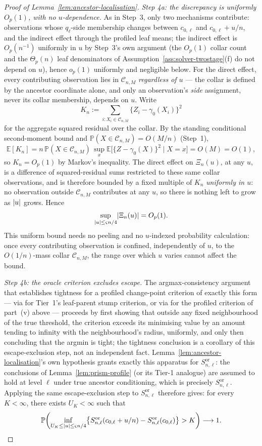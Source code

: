 \documentclass[11pt]{article}
\theoremstyle{plain}
\theoremstyle{definition}
\theoremstyle{remark}
\newcommand{\E}{\mathbb{E}}
\newcommand{\PP}{\mathbb{P}}
\DeclarePairedDelimiter{\abs}{\lvert}{\rvert}
\begin{document}
\begin{proof}[Proof of Lemma~\ref{lem:ancestor-localisation}]
\emph{Step 4a: the discrepancy is uniformly $O_p(1)$, with no $u$-dependence.}
As in Step~3, only two mechanisms contribute: observations whose
$q_\ell$-side membership changes between $c_{0,\ell}$ and $c_{0,\ell}+u/n$,
and the indirect effect through the profiled leaf means; the indirect
effect is $O_p(n^{-1})$ uniformly in $u$ by Step~3's own argument (the
$O_p(1)$ collar count and the $\Theta_p(n)$ leaf denominators of
Assumption~\ref{ass:solver-twostage}(f) do not depend on $u$), hence
$o_p(1)$ uniformly and negligible below. For the direct effect, every
contributing observation lies in $\mathcal C_{n,M}$ \emph{regardless of
$u$} --- the collar is defined by the ancestor coordinate alone, and only
an observation's \emph{side} assignment, never its collar membership,
depends on $u$. Write
\[
  K_n
  :=
  \sum_{i:X_i\in\mathcal C_{n,M}}
  \{Z_i-\gamma_0(X_i)\}^2
\]
for the aggregate squared residual over the collar. By the standing
conditional second-moment bound and $\PP(X\in\mathcal C_{n,M})=O(M/n)$
(Step~1),
\[
  \E[K_n]
  =
  n\,\PP(X\in\mathcal C_{n,M})\,
  \sup_x\E\bigl[\{Z-\gamma_0(X)\}^2\mid X=x\bigr]
  =
  O(M)=O(1),
\]
so $K_n=O_p(1)$ by Markov's inequality. The direct effect on $\Xi_n(u)$, at
any $u$, is a difference of squared-residual sums restricted to these same
collar observations, and is therefore bounded by a fixed multiple of $K_n$
\emph{uniformly in $u$}: no observation outside $\mathcal C_{n,M}$
contributes at any $u$, so there is nothing left to grow as $\abs u$ grows.
Hence
\[
  \sup_{\abs u\le\varsigma n/4}\abs{\Xi_n(u)}=O_p(1).
\]
This uniform bound needs no peeling and no $u$-indexed probability
calculation: once every contributing observation is confined, independently
of $u$, to the $O(1/n)$-mass collar $\mathcal C_{n,M}$, the range over which
$u$ varies cannot affect the bound.

\emph{Step 4b: the oracle criterion excludes escape.} The argmax-consistency
argument that establishes tightness for a profiled change-point criterion of
exactly this form --- via \citet{chan1993,seijosen2011} for Tier~1's
leaf-parent stump criterion, or via \citet{seootsu2018} for the profiled
criterion of part~(v) above --- proceeds by first showing that outside any
fixed neighbourhood of the true threshold, the criterion exceeds its
minimising value by an amount tending to infinity with the neighbourhood's
radius, uniformly, and only then concluding that the argmin is tight; the
tightness conclusion is a corollary of this escape-exclusion step, not an
independent fact. Lemma~\ref{lem:ancestor-localisation}'s own hypothesis
grants exactly this apparatus for $S^{\mathrm{or}}_{n,\ell}$: the
conclusions of Lemma~\ref{lem:prism-profile} (or its Tier-1 analogue) are
assumed to hold at level $\ell$ under true ancestor conditioning, which is
precisely $S^{\mathrm{or}}_{n,\ell}$. Applying the same escape-exclusion
step to $S^{\mathrm{or}}_{n,\ell}$ therefore gives: for every $K<\infty$,
there exists $U_K<\infty$ such that
\[
  \PP\!\left(
    \inf_{U_K\le\abs u\le\varsigma n/4}
    \bigl\{S^{\mathrm{or}}_{n,\ell}(c_{0,\ell}+u/n)
      -S^{\mathrm{or}}_{n,\ell}(c_{0,\ell})\bigr\}
    >K
  \right)
  \longrightarrow1.
\]


\end{proof}
\end{document}
